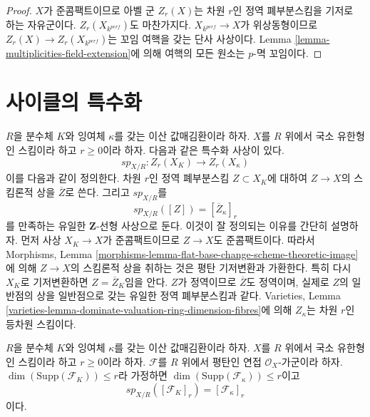 \begin{proof}
$X$가 준콤팩트이므로 아벨 군 $Z_r(X)$는 차원 $r$인 정역
폐부분스킴을 기저로 하는 자유군이다. $Z_r(X_{k^{perf}})$도 마찬가지다.
$X_{k^{perf}} \to X$가 위상동형이므로
$Z_r(X) \to Z_r(X_{k^{perf}})$는 꼬임 여핵을 갖는 단사 사상이다.
Lemma \ref{lemma-multiplicities-field-extension}에 의해 여핵의 모든 원소는
$p$-멱 꼬임이다.
\end{proof}




\section{사이클의 특수화}
\label{section-specialization}

\noindent
$R$을 분수체 $K$와 잉여체 $\kappa$를 갖는 이산 값매김환이라 하자.
$X$를 $R$ 위에서 국소 유한형인 스킴이라 하고 $r \geq 0$이라 하자.
다음과 같은 특수화 사상이 있다.
$$
sp_{X/R} : Z_r(X_K) \longrightarrow Z_r(X_\kappa)
$$
이를 다음과 같이 정의한다. 차원 $r$인 정역 폐부분스킴
$Z \subset X_K$에 대하여 $Z \to X$의 스킴론적 상을
$\overline{Z}$로 쓴다. 그리고 $sp_{X/R}$를
$$
sp_{X/R}([Z]) = [\overline{Z}_\kappa]_r
$$
를 만족하는 유일한 $\mathbf{Z}$-선형 사상으로 둔다. 이것이 잘
정의되는 이유를 간단히 설명하자. 먼저 사상 $X_K \to X$가
준콤팩트이므로 $Z \to X$도 준콤팩트이다. 따라서 Morphisms, Lemma
\ref{morphisms-lemma-flat-base-change-scheme-theoretic-image}에 의해
$Z \to X$의 스킴론적 상을 취하는 것은 평탄 기저변환과 가환한다.
특히 다시 $X_K$로 기저변환하면 $Z = \overline{Z}_K$임을 안다.
$Z$가 정역이므로 $\overline{Z}$도 정역이며, 실제로 $Z$의 일반점의
상을 일반점으로 갖는 유일한 정역 폐부분스킴과 같다.
Varieties, Lemma
\ref{varieties-lemma-dominate-valuation-ring-dimension-fibres}에 의해
$Z_\kappa$는 차원 $r$인 등차원 스킴이다.

\begin{lemma}
\label{lemma-specialization-module}
$R$을 분수체 $K$와 잉여체 $\kappa$를 갖는 이산 값매김환이라 하자.
$X$를 $R$ 위에서 국소 유한형인 스킴이라 하고 $r \geq 0$이라 하자.
$\mathcal{F}$를 $R$ 위에서 평탄인 연접 $\mathcal{O}_X$-가군이라 하자.
$\dim(\text{Supp}(\mathcal{F}_K)) \leq r$라 가정하면
$\dim(\text{Supp}(\mathcal{F}_\kappa)) \leq r$이고
$$
sp_{X/R}([\mathcal{F}_K]_r) = [\mathcal{F}_\kappa]_r
$$
이다.
\end{lemma}

